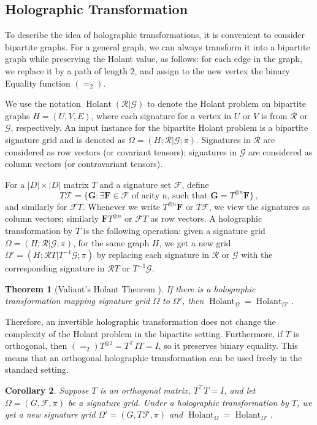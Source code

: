 \documentclass[11pt]{article}
\newtheorem{theorem}{Theorem}[section]
\newtheorem{corollary}[theorem]{Corollary}
\DeclareMathOperator{\hol}{Holant}
\newcommand{\transpose}{^\intercal}
\begin{document}
\subsection{Holographic Transformation}
To describe the idea of holographic transformations, it is convenient to consider bipartite graphs.
For a general graph, we can always transform it into a bipartite graph while preserving the Holant value, as follows:
for each edge in the graph, we replace it by a path of length $2$, and assign to the new vertex the binary Equality function $(=_2)$.

We use the notation $\hol(\mathcal{R} | \mathcal{G})$ to denote the Holant problem on bipartite graphs $H = (U, V, E)$,
where each signature for a vertex in $U$ or $V$ is from $\mathcal{R}$ or $\mathcal{G}$, respectively.
An input instance for the bipartite Holant problem is a bipartite signature grid and is denoted as $\Omega = (H ; \mathcal{R} | \mathcal{G} ; \pi)$.
Signatures in $\mathcal{R}$ are considered as row vectors (or covariant tensors); signatures in $\mathcal{G}$ are considered as column vectors (or contravariant tensors).

For a $\lvert D \rvert \times \lvert D \rvert$ matrix $T$ and a signature set $\mathcal{F}$, define
\[
  T \mathcal{F} = \{\mathbf{G} : \exists \mathbf{F} \in \mathcal{F} \text{ of arity n, such that } \mathbf{G} = T^{\otimes n} \mathbf{F}\} \, ,
\]
and similarly for $\mathcal{F}T$.
Whenever we write $T^{\otimes n} \mathbf{F}$ or $T \mathcal{F}$, we view the signatures as column vectors; similarly $\mathbf{F} T^{\otimes n}$ or $\mathcal{F} T$ as row vectors.
A holographic transformation by $T$ is the following operation:
given a signature grid $\Omega = (H ; \mathcal{R} | \mathcal{G} ; \pi)$, for the same graph $H$,
we get a new grid $\Omega' = (H ; \mathcal{R} T | T^{-1} \mathcal{G}; \pi)$ by replacing each signature in $\mathcal{R}$ or $\mathcal{G}$
with the corresponding signature in $\mathcal{R}T$ or $T^{-1} \mathcal{G}$.

\begin{theorem}[Valiant's Holant Theorem \cite{10.1109/FOCS.2006.7}]
If there is a holographic transformation mapping signature grid $\Omega$ to $\Omega'$, then $\hol_{\Omega} = \hol_{\Omega'}$.
\end{theorem}

Therefore, an invertible holographic transformation does not change the complexity of the Holant problem in the bipartite setting.
Furthermore, if $T$ is orthogonal, then $(=_2)T^{\otimes 2} = T\transpose I T = I$, so it preserves binary equality.
This means that an orthogonal holographic transformation can be used freely in the standard setting.
\begin{corollary}
Suppose $T$ is an orthogonal matrix, $T\transpose T = I$, and let $\Omega = (G, \mathcal{F}, \pi)$ be a signature grid.
Under a holographic transformation by $T$, we get a new signature grid $\Omega' = (G, T \mathcal{F}, \pi)$ and $\hol_{\Omega} = \hol_{\Omega'}$.
\end{corollary}
\end{document}
